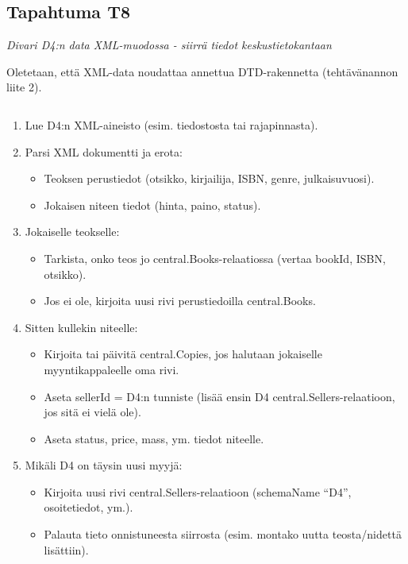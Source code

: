 \documentclass[11pt,a4paper]{article}
\begin{document}
\subsection{Tapahtuma T8}
{\large{\textit{Divari D4:n data XML-muodossa - siirrä tiedot keskustietokantaan}}}

Oletetaan, että XML-data noudattaa annettua DTD-rakennetta (tehtävänannon liite 2).

\inputminted{xml}{assets/dtd.xml}

\begin{enumerate}
	\item Lue D4:n XML-aineisto (esim. tiedostosta tai rajapinnasta).
	\item Parsi XML dokumentti ja erota:
	      \begin{itemize}
		      \item Teoksen perustiedot (otsikko, kirjailija, ISBN, genre, julkaisuvuosi).
		      \item Jokaisen niteen tiedot (hinta, paino, status).
	      \end{itemize}
	\item Jokaiselle teokselle:
	      \begin{itemize}
		      \item Tarkista, onko teos jo central.Books-relaatiossa (vertaa bookId, ISBN, otsikko).
		      \item Jos ei ole, kirjoita uusi rivi perustiedoilla central.Books.
	      \end{itemize}
	\item Sitten kullekin niteelle:
	      \begin{itemize}
		      \item Kirjoita tai päivitä central.Copies, jos halutaan jokaiselle myyntikappaleelle oma rivi.
		      \item Aseta sellerId = D4:n tunniste (lisää ensin D4 central.Sellers-relaatioon, jos sitä ei vielä ole).
		      \item Aseta status, price, mass, ym. tiedot niteelle.
	      \end{itemize}
	\item Mikäli D4 on täysin uusi myyjä:
	      \begin{itemize}
		      \item Kirjoita uusi rivi central.Sellers-relaatioon (schemaName “D4”, osoitetiedot, ym.).
		      \item Palauta tieto onnistuneesta siirrosta (esim. montako uutta teosta/nidettä lisättiin).
	      \end{itemize}
\end{enumerate}
\end{document}
